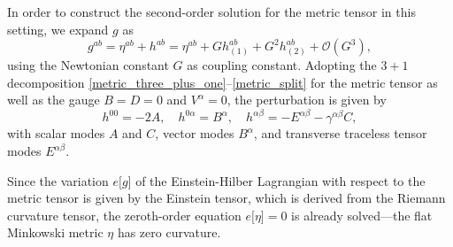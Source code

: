 In order to construct the second-order solution for the metric tensor in this setting, we expand $g$ as
\begin{equation}
  g^{ab} = \eta^{ab} + h^{ab} = \eta^{ab} + G h^{ab}_{(1)} + G^2 h^{ab}_{(2)} + \mathcal O(G^3),
\end{equation}
using the Newtonian constant $G$ as coupling constant. Adopting the $3+1$ decomposition \eqref{metric_three_plus_one}--\eqref{metric_split} for the metric tensor as well as the gauge $B=D=0$ and $V^\alpha=0$, the perturbation is given by
\begin{equation}
  h^{00} = -2A, \quad h^{0\alpha} = B^\alpha,\quad h^{\alpha\beta} = - E^{\alpha\beta} - \gamma^{\alpha\beta} C,
\end{equation}
with scalar modes $A$ and $C$, vector modes $B^\alpha$, and transverse traceless tensor modes $E^{\alpha\beta}$.

Since the variation $e\lbrack g\rbrack$ of the Einstein-Hilber Lagrangian with respect to the metric tensor is given by the Einstein tensor, which is derived from the Riemann curvature tensor, the zeroth-order equation $e\lbrack \eta\rbrack = 0$ is already solved---the flat Minkowski metric $\eta$ has zero curvature.

